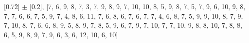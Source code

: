 
[0.72] $\pm$ [0.2], [7, 6, 9, 8, 7, 3, 7, 9, 8, 9, 7, 10, 10, 8, 5, 9, 8, 7, 5, 7, 9, 6, 10, 9, 8, 7, 7, 6, 6, 7, 5, 9, 7, 4, 8, 6, 11, 7, 6, 8, 6, 7, 6, 7, 7, 4, 6, 8, 7, 5, 9, 9, 10, 8, 7, 9, 7, 10, 8, 7, 6, 6, 8, 9, 5, 8, 9, 7, 8, 5, 9, 6, 7, 9, 7, 10, 7, 7, 10, 9, 8, 8, 10, 7, 8, 8, 6, 5, 9, 8, 9, 7, 9, 6, 3, 6, 12, 10, 6, 10]\\
